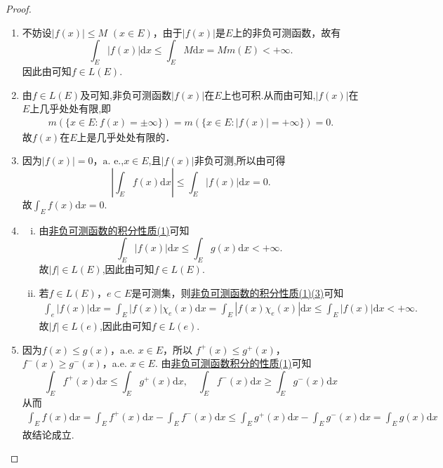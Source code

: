 \documentclass[../../main.tex]{subfiles}%
\begin{document}
\begin{proof}
\begin{enumerate}[(1)]
\item 不妨设\(|f(x)| \leqslant M\) \((x \in E)\)，由于\(|f(x)|\)是\(E\)上的非负可测函数，故有
\[
\int_E |f(x)| \mathrm{d}x \leqslant \int_E M \mathrm{d}x = M m(E) < +\infty.
\]
因此由可知$f \in L(E).$

\item 由$f\in L(E)$及可知,非负可测函数$|f(x)|$在$E$上也可积.从而由可知,$|f(x)|$在$E$上几乎处处有限,即
\begin{align*}
m(\{x\in E:f(x)=\pm \infty\})=m(\{x\in E:|f(x)|=+\infty\})=0.
\end{align*}
故\(f(x)\)在\(E\)上是几乎处处有限的．

\item 因为\(|f(x)| = 0\)，\(\text{a. e.}\),$x\in E$,且$|f(x)|$非负可测,所以由可得
\[
\left| \int_E f(x) \mathrm{d}x \right| \leqslant \int_E |f(x)| \mathrm{d}x = 0.
\]
故$\int_E f(x) \mathrm{d}x = 0.$

\item \begin{enumerate}[(i)]
\item 由\hyperref[theorem:非负可测函数积分的性质]{非负可测函数的积分性质(1)}可知
\[
\int_E |f(x)| \mathrm{d}x \leqslant \int_E g(x) \mathrm{d}x < +\infty.
\]
故$|f|\in L(E)$,因此由可知$f \in L(E).$

\item 若\(f \in L(E)\)，\(e \subset E\)是可测集，则\hyperref[theorem:非负可测函数积分的性质]{非负可测函数的积分性质(1)(3)}可知
\begin{align*}
\int_e{\left| f\left( x \right) \right|\mathrm{d}x}=\int_E{\left| f\left( x \right) \right|\chi _e\left( x \right) \mathrm{d}x}=\int_E{\left| f\left( x \right) \chi _e\left( x \right) \right|\mathrm{d}x}\leqslant \int_E{\left| f\left( x \right) \right|\mathrm{d}x}<+\infty .
\end{align*}
故$|f|\in L(e)$,因此由可知$f \in L(e).$
\end{enumerate}

\item 因为\( f(x) \leqslant g(x) \)，a.e. \( x \in E \)，所以 \( f^+(x) \leqslant g^+(x) \)，\( f^-(x) \geqslant g^-(x) \)，a.e. \( x \in E \). 由\hyperref[theorem:非负可测函数积分的性质]{非负可测函数积分的性质(1)}可知
\[
\int_E f^+(x)\mathrm{d}x \leqslant \int_E g^+(x)\mathrm{d}x, \quad \int_E f^-(x)\mathrm{d}x \geqslant \int_E g^-(x)\mathrm{d}x
\]
从而
\begin{align*}
\int_E f(x)\mathrm{d}x = \int_E f^+(x)\mathrm{d}x - \int_E f^-(x)\mathrm{d}x 
\leqslant \int_E g^+(x)\mathrm{d}x - \int_E g^-(x)\mathrm{d}x = \int_E g(x)\mathrm{d}x
\end{align*}
故结论成立.


\end{enumerate}
\end{proof}
\end{document}
